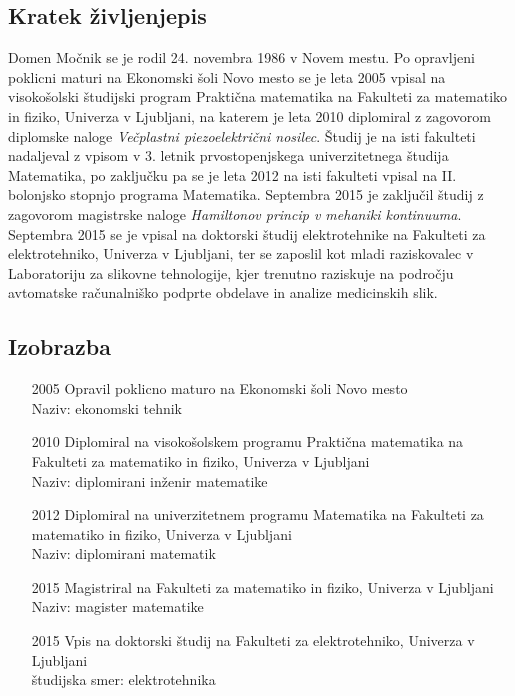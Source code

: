 \documentclass[a4paper,twoside,11pt]{article}
\begin{document}
	\subsection*{Kratek življenjepis}
	\par{
		Domen Močnik se je rodil 24. novembra 1986 v Novem mestu. Po opravljeni poklicni maturi na Ekonomski šoli Novo mesto se je leta 2005 vpisal na visokošolski študijski program Praktična matematika na Fakulteti za matematiko in fiziko, Univerza v Ljubljani, na katerem je leta 2010 diplomiral z zagovorom diplomske naloge \textit{Večplastni piezoelektrični nosilec}. Študij je na isti fakulteti nadaljeval z vpisom v 3. letnik prvostopenjskega univerzitetnega študija Matematika, po zaključku pa se je leta 2012 na isti fakulteti vpisal na II. bolonjsko stopnjo programa Matematika. Septembra 2015 je zaključil študij z zagovorom magistrske naloge \textit{Hamiltonov princip v mehaniki kontinuuma}. Septembra 2015 se je vpisal na doktorski študij elektrotehnike na Fakulteti za elektrotehniko, Univerza v Ljubljani, ter se zaposlil kot mladi raziskovalec v Laboratoriju za slikovne tehnologije, kjer trenutno raziskuje na področju avtomatske računalniško podprte obdelave in analize medicinskih slik.
	}
	
	\subsection*{Izobrazba}
	\begin{itemize}[align=left, itemsep=-0.1cm, leftmargin=1cm, labelwidth=*]
		\item[2005] Opravil poklicno maturo na Ekonomski šoli Novo mesto \\ Naziv: ekonomski tehnik
		\item[2010] Diplomiral na visokošolskem programu Praktična matematika na Fakulteti za matematiko in fiziko, Univerza v Ljubljani \\ Naziv: diplomirani inženir matematike
		\item[2012] Diplomiral na univerzitetnem programu Matematika na Fakulteti za matematiko in fiziko, Univerza v Ljubljani \\ Naziv: diplomirani matematik
		\item[2015] Magistriral na Fakulteti za matematiko in fiziko, Univerza v Ljubljani \\ Naziv: magister matematike
		\item[2015] Vpis na doktorski študij na Fakulteti za elektrotehniko, Univerza v Ljubljani \\ študijska smer: elektrotehnika
	\end{itemize}
	
\end{document}

